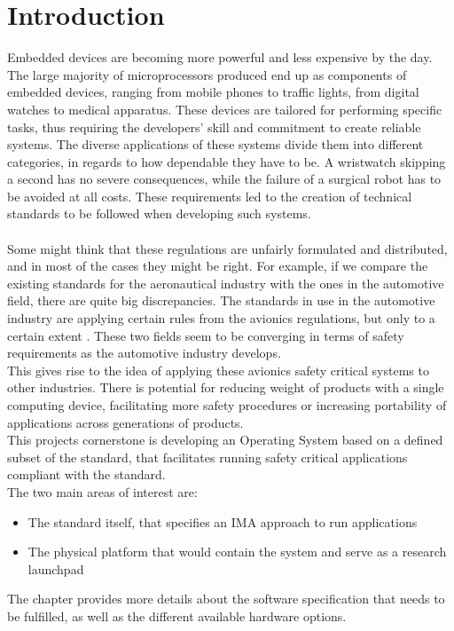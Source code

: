 \chapter{Introduction}\label{ch:introduction} 

Embedded devices are becoming more powerful and less expensive by the day. The large majority of
microprocessors produced end up as components of embedded devices, ranging from mobile phones
to traffic lights, from digital watches to medical apparatus. These devices are tailored for 
performing specific tasks, thus requiring the developers' skill and commitment to create reliable
systems. The diverse applications of these systems divide them into different categories, in regards to
how dependable they have to be. A wristwatch skipping a second has no severe consequences, while the
failure of a surgical robot has to be avoided at all costs. These requirements led to the creation 
of technical standards to be followed when developing such systems. 
\\\\
Some might think that these regulations are unfairly formulated and distributed, and in most
of the cases they might be right. For example, if we compare the existing standards for the aeronautical industry with the ones in the automotive field, there are quite big discrepancies. The standards 
in use in the automotive industry are applying certain rules from the avionics regulations, 
but only to a certain extent
\cite {can_cars_fly}.
These two fields seem to be converging in terms of safety requirements as the automotive industry develops.
\\
This gives rise to the idea of applying these avionics safety critical systems to other industries.
There is potential for reducing weight of products with a single computing device, facilitating more safety procedures 
or increasing portability of applications across generations of products.
\\
This project\textquotesingle s cornerstone is developing an Operating System based on a defined subset of the \arinc{} standard, that facilitates running safety critical applications compliant with the \arinc{} standard. 
\\
The two main areas of interest are:
\\
\begin{itemize}
\item The standard itself, that specifies an IMA approach to run applications
\item The physical platform that would contain the system and serve as a research launchpad
\end{itemize}
The  chapter provides more details about the software specification that needs to be fulfilled,
as well as the different available hardware options.